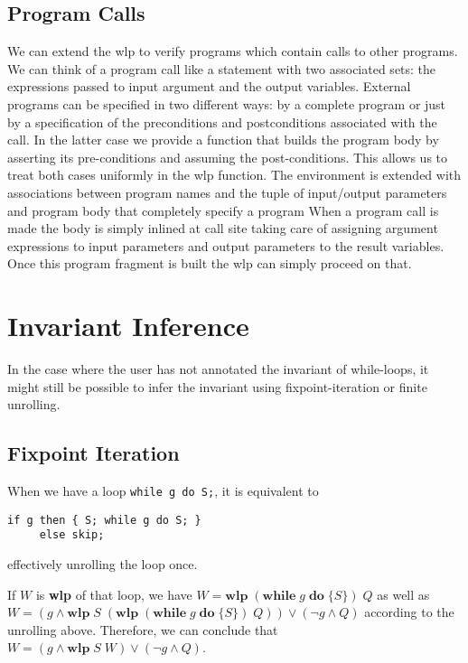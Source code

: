 \documentclass[]{scrartcl}
\newcommand{\WHILE}[2]{\ensuremath{\mathbf{while}\;#1\;\mathbf{do}\;\{#2\}}}
\newcommand{\WLP}[2]{\ensuremath{\mathbf{wlp}\;#1\;#2}}
\begin{document}
\subsection{Program Calls}

We can extend the wlp to verify programs which contain calls to other programs.
We can think of a program call like a statement with two associated sets:
the expressions passed to input argument and the output variables.
External programs can be specified in two different ways: by a complete program or
just by a specification of the preconditions and postconditions associated with
the call.
In the latter case we provide a function that builds the program body by asserting
its pre-conditions and assuming the post-conditions.
This allows us to treat both cases uniformly in the wlp function.
The environment is extended with associations between program names and the
tuple of input/output parameters and program body that completely specify a program
When a program call is made the body is simply inlined at call site taking care
of assigning argument expressions to input parameters and output parameters to the result variables.
Once this program fragment is built the wlp can simply proceed on that.

\section{Invariant Inference}

In the case where the user has not annotated the invariant of while-loops,
it might still be possible to infer the invariant using fixpoint-iteration
or finite unrolling.

\subsection{Fixpoint Iteration}

When we have a loop \lstinline|while g do S;|, it is equivalent to
\begin{lstlisting}
if g then { S; while g do S; }
     else skip;
\end{lstlisting}
effectively unrolling the loop once.

If $W$ is \textbf{wlp} of that loop, we have $W = \WLP{(\WHILE{g}{S})}{Q}$ as well as
$W = (g \land \WLP{S}{(\WLP{(\WHILE{g}{S})}{Q})}) \lor (\neg g \land Q)$ according to the unrolling above.
Therefore, we can conclude that $W = (g \land \WLP{S}{W}) \lor (\neg g \land Q)$.
\end{document}
